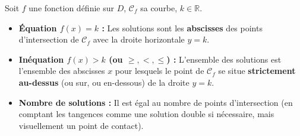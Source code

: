 \documentclass[11pt]{article}
\begin{document}
\begin{propriete}
Soit $f$ une fonction définie sur $D$, $\mathcal{C}_f$ sa courbe, $k \in \mathbb{R}$.
\begin{itemize}
    \item \textbf{Équation $f(x) = k$ :} Les solutions sont les \textbf{abscisses} des points d'intersection de $\mathcal{C}_f$ avec la droite horizontale $y=k$.
    \item \textbf{Inéquation $f(x) > k$ (ou $\ge, <, \le$) :} L'ensemble des solutions est l'ensemble des abscisses $x$ pour lesquels le point de $\mathcal{C}_f$ se situe \textbf{strictement au-dessus} (ou sur, ou en-dessous) de la droite $y=k$.
    \item \textbf{Nombre de solutions :} Il est égal au nombre de points d'intersection (en comptant les tangences comme une solution double si nécessaire, mais visuellement un point de contact).
\end{itemize}
\end{propriete}
\end{document}
